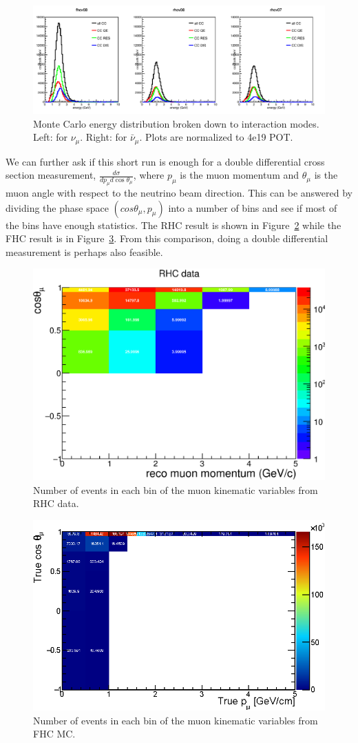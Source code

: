 \documentclass[12pt,a4paper,final]{iopart}
\begin{document}
\begin{figure}
  \centering
  \includegraphics[width=.7\textwidth]{figures/2016/enspec_crop.pdf}
  \caption{Monte Carlo energy distribution broken down to interaction modes. Left: for $\nu_\mu$.  Right: for $\bar{\nu}_\mu$. Plots are normalized to 4e19 POT.}
  \label{fig:2016enspec}
\end{figure}

We can further ask if this short run is enough for a double differential cross section measurement, $\frac{d\sigma}{dp_\mu d\cos\theta_\mu}$, where $p_\mu$ is the muon momentum and $\theta_\mu$ is the muon angle with respect to the neutrino beam direction. This can be answered by dividing the phase space $(cos\theta_\mu, p_\mu)$ into a number of bins and see if most of the bins have enough statistics. The RHC result is shown in Figure~\ref{fig:2016rhc2dbin} while the FHC result is in Figure~\ref{fig:2016fhc2dbin}. From this comparison, doing a double differential measurement is perhaps also feasible.

\begin{figure}
  \centering
  \includegraphics[width=.7\textwidth]{figures/2016/cosvspcoarse_text.eps}
  \caption{Number of events in each bin of the muon kinematic variables from RHC data.}
  \label{fig:2016rhc2dbin}
\end{figure}

\begin{figure}
  \centering
  \includegraphics[width=.7\textwidth]{figures/2016/kanika_2d_binning.eps}
  \caption{Number of events in each bin of the muon kinematic variables from FHC MC.}
  \label{fig:2016fhc2dbin}
\end{figure}
\end{document}
